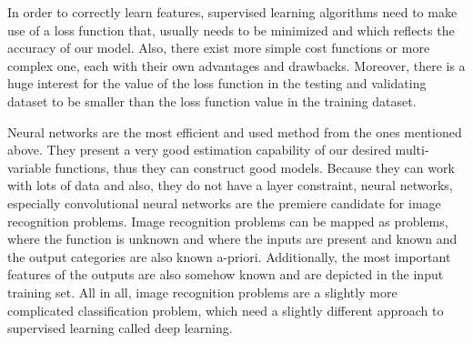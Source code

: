 \documentclass[12pt,a4paper,twoside]{report}
\begin{document}
In order to correctly learn features, supervised learning algorithms need to make use of a loss function that, usually needs to be minimized and which reflects the accuracy of our model. Also, there exist more simple cost functions or more complex one, each with their own advantages and drawbacks. Moreover, there is a huge interest for the value of the loss function in the testing and validating dataset to be smaller than the loss function value in the training dataset. \par
Neural networks are the most efficient and used method from the ones mentioned above. They present a very good estimation capability of our desired multi-variable functions, thus they can construct good models. Because they can work with lots of data and also, they do not have a layer constraint, neural networks, especially convolutional neural networks are the premiere candidate for image recognition problems. Image recognition problems can be mapped as problems, where the function is unknown and where the inputs are present and known and the output categories are also known a-priori. Additionally, the most important features of the outputs are also somehow known and are depicted in the input training set. All in all, image recognition problems are a slightly more complicated classification problem, which need a slightly different approach to supervised learning called deep learning.\par
\end{document}
